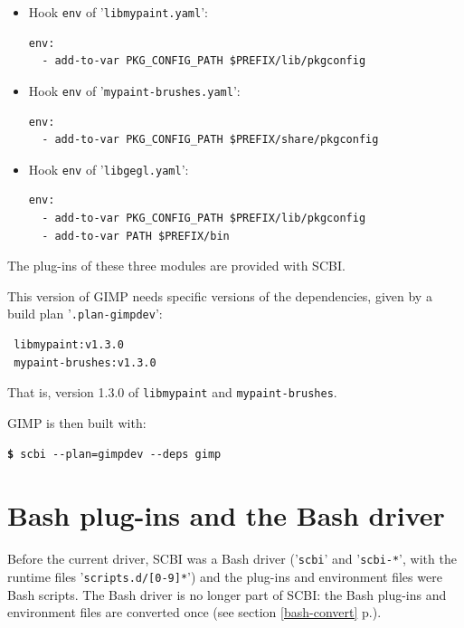 \documentclass[a4paper,12pt,twoside]{article}
\newcommand{\code}[1]{\texttt{#1}}
\newcommand{\seeref}[1]{see section \ref{#1} p.\pageref{#1}}
\newcommand{\file}[1]{'{\texttt{#1}}'}
\newcommand{\cmd}[1]{\tabto{1cm}\hspace{0.5cm}\texttt{\textbf{\$} #1}}
\let\stdsection\section
\renewcommand\section{\newpage\stdsection}
\newcommand{\ddash}{-{}-}
\begin{document}
\begin{itemize}
	\item Hook \code{env} of \file{libmypaint.yaml}:

	\begin{lstlisting}
env:
  - add-to-var PKG_CONFIG_PATH $PREFIX/lib/pkgconfig
	\end{lstlisting}

	\item Hook \code{env} of \file{mypaint-brushes.yaml}:

	\begin{lstlisting}
env:
  - add-to-var PKG_CONFIG_PATH $PREFIX/share/pkgconfig
	\end{lstlisting}

	\item Hook \code{env} of \file{libgegl.yaml}:

	\begin{lstlisting}
env:
  - add-to-var PKG_CONFIG_PATH $PREFIX/lib/pkgconfig
  - add-to-var PATH $PREFIX/bin
	\end{lstlisting}

\end{itemize}

The plug-ins of these three modules are provided with SCBI.

This version of GIMP needs specific versions of the dependencies, given by a build plan \file{.plan-gimpdev}:

\begin{lstlisting}
 libmypaint:v1.3.0
 mypaint-brushes:v1.3.0
\end{lstlisting}

That is, version 1.3.0 of \code{libmypaint} and \code{mypaint-brushes}.

GIMP is then built with:

\cmd{scbi \ddash{}plan=gimpdev \ddash{}deps gimp}


\appendix

\section{Bash plug-ins and the Bash driver}
\label{bash-plugins}

Before the current driver, SCBI was a Bash driver (\file{scbi} and
\file{scbi-*}, with the runtime files \file{scripts.d/[0-9]*}) and the
plug-ins and environment files were Bash scripts. The Bash driver is no
longer part of SCBI: the Bash plug-ins and environment files are converted
once (\seeref{bash-convert}).
\end{document}
